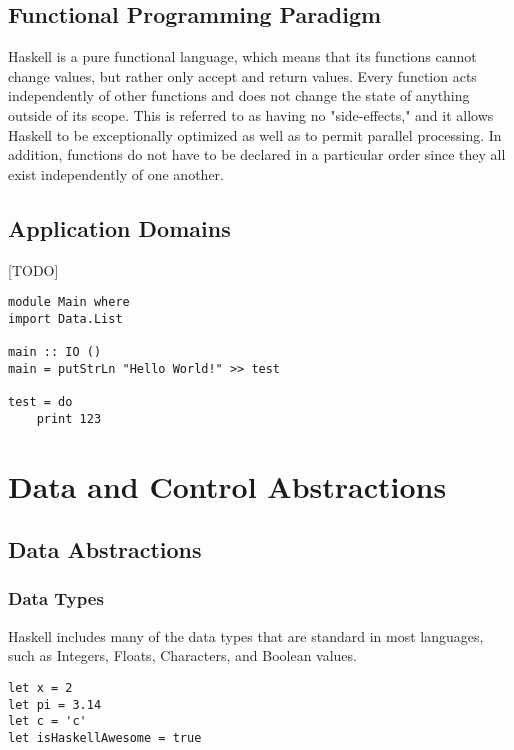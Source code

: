 \documentclass[titlepage,12pt]{article}
\begin{document}
\subsection{Functional Programming Paradigm}

Haskell is a pure functional language, which means that its functions cannot change values, but rather only accept and 
return values. Every function acts independently of other functions and does not change the state of anything outside 
of its scope. This is referred to as having no "side-effects," and it allows Haskell to be exceptionally optimized as 
well as to permit parallel processing. In addition, functions do not have to be declared in a particular order since 
they all exist independently of one another. 

\subsection{Application Domains}


[TODO]~\cite{learnyouahaskell}
\begin{verbatim}
module Main where
import Data.List

main :: IO ()
main = putStrLn "Hello World!" >> test

test = do 
    print 123
\end{verbatim}

\section{Data and Control Abstractions}


\subsection{Data Abstractions}
\subsubsection{Data Types}

Haskell includes many of the data types that are standard in most languages, such as Integers, Floats, Characters, and Boolean values. 

 

\begin{verbatim}
let x = 2
let pi = 3.14
let c = 'c'
let isHaskellAwesome = true
\end{verbatim}
\end{document}
